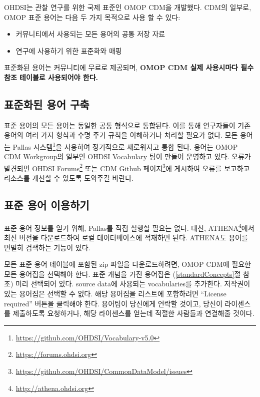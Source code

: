 \documentclass[11pt]{book}
\providecommand{\tightlist}{%
  \setlength{\itemsep}{0pt}\setlength{\parskip}{0pt}}
\let\rmarkdownfootnote\footnote%
\def\footnote{\protect\rmarkdownfootnote}
\theoremstyle{definition}
\theoremstyle{definition}
\theoremstyle{definition}
\theoremstyle{remark}
\begin{document}
OHDSI는 관찰 연구를 위한 국제 표준인 OMOP CDM을 개발했다. CDM의 일부로,
OMOP 표준 용어는 다음 두 가지 목적으로 사용 할 수 있다:

\begin{itemize}
\tightlist
\item
  커뮤니티에서 사용되는 모든 용어의 공통 저장 자료
\item
  연구에 사용하기 위한 표준화와 매핑
\end{itemize}

표준화된 용어는 커뮤니티에 무료로 제공되며, \textbf{OMOP CDM 실제
사용시마다 필수 참조 테이블로 사용되어야 한다.}

\subsection{표준화된 용어 구축}\label{--}

표준 용어의 모든 용어는 동일한 공통 형식으로 통합된다. 이를 통해
연구자들이 기존 용어의 여러 가지 형식과 수명 주기 규칙을 이해하거나
처리할 필요가 없다. 모든 용어는 Pallas 시스템\footnote{\url{https://github.com/OHDSI/Vocabulary-v5.0}}을
사용하여 정기적으로 새로워지고 통합 된다. 용어는 OMOP CDM Workgroup의
일부인 OHDSI Vocabulary 팀이 만들어 운영하고 있다. 오류가 발견되면 OHDSI
Forums\footnote{\url{https://forums.ohdsi.org}} 또는 CDM Github
페이지\footnote{\url{https://github.com/OHDSI/CommonDataModel/issues}}에
게시하여 오류를 보고하고 리소스를 개선할 수 있도록 도와주길
바란다.

\subsection{표준 용어 이용하기}\label{accessVocabularies}

표준 용어 정보를 얻기 위해, Pallas를 직접 실행할 필요는 없다. 대신,
ATHENA\footnote{\url{http://athena.ohdsi.org}}에서 최신 버전을
다운로드하여 로컬 데이터베이스에 적재하면 된다. ATHENA도 용어를 면밀히
검색하는 기능이 있다. 

모든 표준 용어 테이블에 포함된 zip 파일을 다운로드하려면, OMOP CDM에
필요한 모든 용어집을 선택해야 한다. 표준 개념을 가진 용어집은
(\ref{standardConcepts}절 참조) 미리 선택되어 있다. source data에
사용되는 vocabularies를 추가한다. 저작권이 있는 용어집은 선택할 수 없다.
해당 용어집을 리스트에 포함하려면 ``License required'' 버튼을 클릭해야
한다. 용어팀이 당신에게 연락할 것이고, 당신이 라이센스를 제출하도록
요청하거나, 해당 라이센스를 얻는데 적절한 사람들과 연결해줄 것이다.
\end{document}
